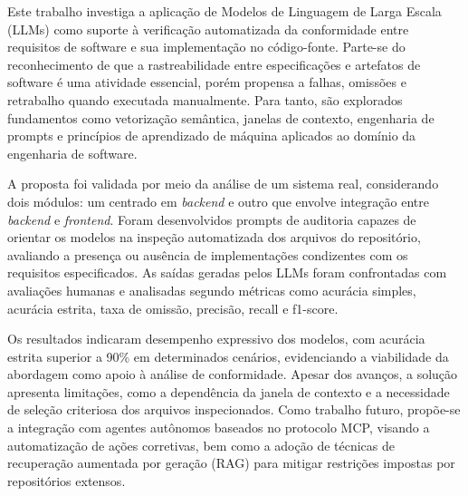 Este trabalho investiga a aplicação de Modelos de Linguagem de Larga Escala (LLMs) como suporte à verificação automatizada da conformidade entre requisitos de software e sua implementação no código-fonte. Parte-se do reconhecimento de que a rastreabilidade entre especificações e artefatos de software é uma atividade essencial, porém propensa a falhas, omissões e retrabalho quando executada manualmente. Para tanto, são explorados fundamentos como vetorização semântica, janelas de contexto, engenharia de prompts e princípios de aprendizado de máquina aplicados ao domínio da engenharia de software.

A proposta foi validada por meio da análise de um sistema real, considerando dois módulos: um centrado em \textit{backend} e outro que envolve integração entre \textit{backend} e \textit{frontend}. Foram desenvolvidos prompts de auditoria capazes de orientar os modelos na inspeção automatizada dos arquivos do repositório, avaliando a presença ou ausência de implementações condizentes com os requisitos especificados. As saídas geradas pelos LLMs foram confrontadas com avaliações humanas e analisadas segundo métricas como acurácia simples, acurácia estrita, taxa de omissão, precisão, recall e f1-score.

Os resultados indicaram desempenho expressivo dos modelos, com acurácia estrita superior a 90\% em determinados cenários, evidenciando a viabilidade da abordagem como apoio à análise de conformidade. Apesar dos avanços, a solução apresenta limitações, como a dependência da janela de contexto e a necessidade de seleção criteriosa dos arquivos inspecionados. Como trabalho futuro, propõe-se a integração com agentes autônomos baseados no protocolo MCP, visando a automatização de ações corretivas, bem como a adoção de técnicas de recuperação aumentada por geração (RAG) para mitigar restrições impostas por repositórios extensos.
